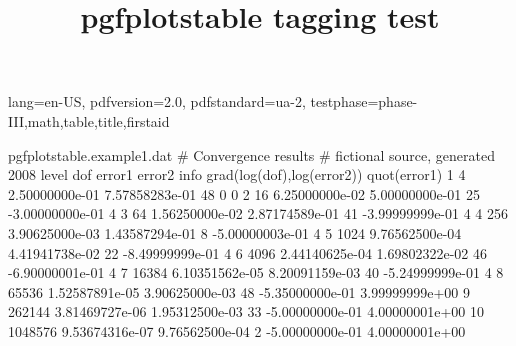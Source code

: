 \DocumentMetadata
  {
    lang=en-US,
    pdfversion=2.0,
    pdfstandard=ua-2,
    testphase={phase-III,math,table,title,firstaid}
  }
\begin{filecontents*}{pgfplotstable.example1.dat}
# Convergence results
# fictional source, generated 2008
level dof error1 error2 info grad(log(dof),log(error2)) quot(error1)
1 4 2.50000000e-01 7.57858283e-01 48 0 0
2 16 6.25000000e-02 5.00000000e-01 25 -3.00000000e-01 4
3 64 1.56250000e-02 2.87174589e-01 41 -3.99999999e-01 4
4 256 3.90625000e-03 1.43587294e-01 8 -5.00000003e-01 4
5 1024 9.76562500e-04 4.41941738e-02 22 -8.49999999e-01 4
6 4096 2.44140625e-04 1.69802322e-02 46 -6.90000001e-01 4
7 16384 6.10351562e-05 8.20091159e-03 40 -5.24999999e-01 4
8 65536 1.52587891e-05 3.90625000e-03 48 -5.35000000e-01 3.99999999e+00
9 262144 3.81469727e-06 1.95312500e-03 33 -5.00000000e-01 4.00000001e+00
10 1048576 9.53674316e-07 9.76562500e-04 2 -5.00000000e-01 4.00000001e+00
\end{filecontents*}

\documentclass{article}
\usepackage{pgfplotstable,booktabs}
\pgfplotsset{compat=newest}

\title{pgfplotstable tagging test}




\bigskip

         


